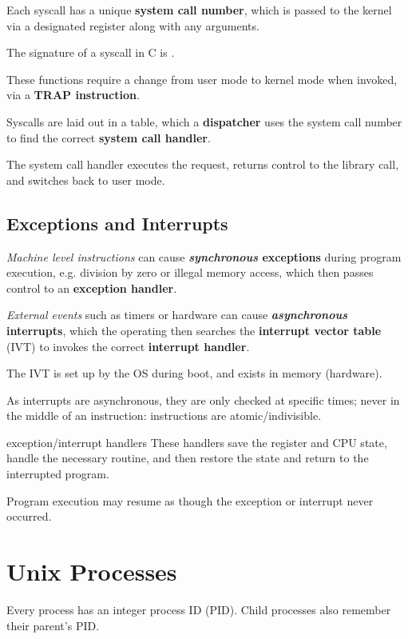 Each syscall has a unique \textbf{system call number}, which is passed to the kernel via a designated register along with any arguments.

The signature of a syscall in C is .

These functions require a change from user mode to kernel mode when invoked, via a \textbf{TRAP instruction}.

Syscalls are laid out in a table, which a \textbf{dispatcher} uses the system call number to find the correct \textbf{system call handler}.

The system call handler executes the request, returns control to the library call, and switches back to user mode.

\subsection{Exceptions and Interrupts}
\textit{Machine level instructions} can cause \textbf{\textit{synchronous} exceptions} during program execution, e.g. division by zero or illegal memory access, which then passes control to an \textbf{exception handler}.

\textit{External events} such as timers or hardware can cause \textbf{\textit{asynchronous} interrupts}, which the operating then searches the \textbf{interrupt vector table} (IVT) to invokes the correct \textbf{interrupt handler}.

The IVT is set up by the OS during boot, and exists in memory (hardware).

As interrupts are asynchronous, they are only checked at specific times; never in the middle of an instruction: instructions are atomic/indivisible.

\begin{defn}{exception/interrupt handlers}
    These handlers save the register and CPU state, handle the necessary routine, and then restore the state and return to the interrupted program.

    Program execution may resume as though the exception or interrupt never occurred.
\end{defn}

\section{Unix Processes}
Every process has an integer process ID (PID).
Child processes also remember their parent's PID.

